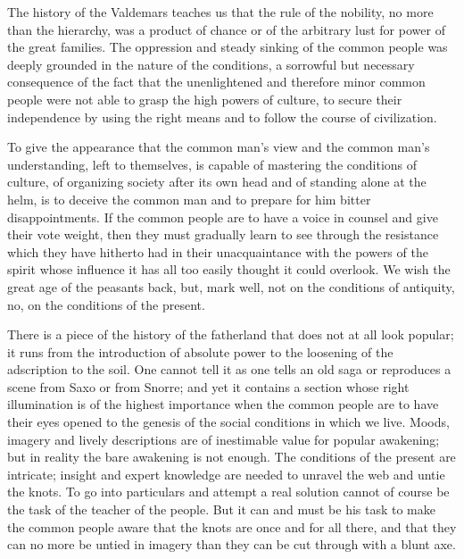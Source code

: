 \documentclass[12pt,a4paper,openany]{book}
\newcommand{\opage}[1]{\marginnote{\footnotesize\textit{[#1]}}}
\begin{document}
The history of the Valdemars teaches us that the rule of the nobility,
no more than the hierarchy, was a product of
chance or of the arbitrary lust for power of the great families.
The oppression and steady sinking of the common people
was deeply grounded in the nature of the conditions, a sorrowful
but necessary consequence of the fact that the unenlightened and therefore
minor common people were not able to grasp the high
powers of culture, to secure their independence by using
the right means and to follow the course of civilization.

To give the appearance that the common man's view and
the common man's understanding, left to themselves, is capable
of mastering the conditions of culture, of organizing society
after its own head and of standing alone at the
helm, is to deceive the common man and to prepare for him
bitter disappointments. If the common people are to have a voice in counsel and
give their vote weight, then they must gradually learn
to see through the resistance which they have hitherto had
in their unacquaintance with the powers of the spirit whose
\setcounter{footnote}{0}%
\opage{137}influence it has all too easily thought it could overlook.
We wish the great age of the peasants back, but, mark well,
not on the conditions of antiquity, no, on the conditions of the present.

There is a piece of the history of the fatherland that does not at all
look popular; it runs from the introduction of absolute power
to the loosening of the adscription to the soil. One cannot tell
it as one tells an old saga or
reproduces a scene from Saxo or from Snorre; and yet
it contains a section whose right illumination is of the highest
importance when the common people are to have their eyes opened to
the genesis of the social conditions in which we live.
Moods, imagery and lively descriptions are of
inestimable value for popular awakening; but in
reality the bare awakening is not enough. The conditions of the present
are intricate; insight and
expert knowledge are needed to unravel the web and untie the knots.
To go into particulars and attempt a real solution
cannot of course be the task of the teacher of the people.
But it can and must be his task to make the
common people aware that the knots are once and for all
there, and that they can no more be untied in
imagery than they can be cut through with a blunt axe.
\end{document}
